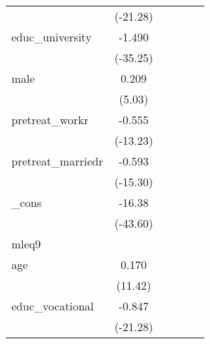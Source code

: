 {\begin{tabular}{l*{5}{c}}
            &    (-21.28)         &                     &                     &                     &                     \\
[1em]
educ\_university&      -1.490\sym{***}&                     &                     &                     &                     \\
            &    (-35.25)         &                     &                     &                     &                     \\
[1em]
male        &       0.209\sym{***}&                     &                     &                     &                     \\
            &      (5.03)         &                     &                     &                     &                     \\
[1em]
pretreat\_workr&      -0.555\sym{***}&                     &                     &                     &                     \\
            &    (-13.23)         &                     &                     &                     &                     \\
[1em]
pretreat\_marriedr&      -0.593\sym{***}&                     &                     &                     &                     \\
            &    (-15.30)         &                     &                     &                     &                     \\
[1em]
\_cons      &      -16.38\sym{***}&                     &                     &                     &                     \\
            &    (-43.60)         &                     &                     &                     &                     \\
\hline
mleq9       &                     &                     &                     &                     &                     \\
age         &       0.170\sym{***}&                     &                     &                     &                     \\
            &     (11.42)         &                     &                     &                     &                     \\
[1em]
educ\_vocational&      -0.847\sym{***}&                     &                     &                     &                     \\
            &    (-21.28)         &                     &                     &                     &                     \\

\end{tabular}}
